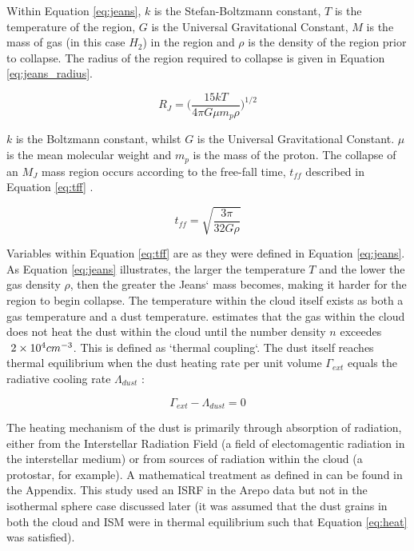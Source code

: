 \documentclass{report}
\begin{document}
Within Equation \ref{eq:jeans}, $k$ is the Stefan-Boltzmann constant, $T$ is the temperature of the region, $G$ is the Universal Gravitational Constant, $M$ is the mass of gas (in this case $H_{2}$) in the region and $\rho$ is the density of the region prior to collapse. The radius of the region required to collapse is given in Equation \ref{eq:jeans_radius}.

\begin{equation}
  R_{J} = \Bigg ( \frac{15 k T}{4\pi G \mu m_{p} \rho} \Bigg ) ^{1/2}
  \label{eq:jeans_radius}
\end{equation}

$k$ is the Boltzmann constant, whilst $G$ is the Universal Gravitational Constant. $\mu$ is the mean molecular weight and $m_{p}$ is the mass of the proton. The collapse of an $M_{J}$ mass region occurs according to the free-fall time, $t_{ff}$ described in Equation \ref{eq:tff} \parencite{jeans}.

\begin{equation}
  t_{ff} = \sqrt{\frac{3\pi}{32G\rho}}
  \label{eq:tff}
\end{equation}

Variables within Equation \ref{eq:tff} are as they were defined in Equation \ref{eq:jeans}. As Equation \ref{eq:jeans} illustrates, the larger the temperature $T$ and the lower the gas density $\rho$, then the greater the Jeans` mass becomes, making it harder for the region to begin collapse. The temperature within the cloud itself exists as both a gas temperature and a dust temperature. \textcite{decouple} estimates that the gas within the cloud does not heat the dust within the cloud until the number density $n$ exceedes $~2\times10^{4}\/cm^{-3}$. This is defined as `thermal coupling`. The dust itself reaches thermal equilibrium when the dust heating rate per unit volume $\Gamma_{ext}$ equals the radiative cooling rate $\Lambda_{dust}$ \parencite{treecol}:

\begin{equation}
  \Gamma_{ext} - \Lambda_{dust} = 0
  \label{eq:heat}
\end{equation}

The heating mechanism of the dust is primarily through absorption of radiation, either from the Interstellar Radiation Field (a field of electomagentic radiation in the interstellar medium) or from sources of radiation within the cloud (a protostar, for example). A mathematical treatment as defined in \textcite{treecol} can be found in the Appendix. This study used an ISRF in the Arepo data but not in the isothermal sphere case discussed later (it was assumed that the dust grains in both the cloud and ISM were in thermal equilibrium such that Equation \ref{eq:heat} was satisfied).
\end{document}
